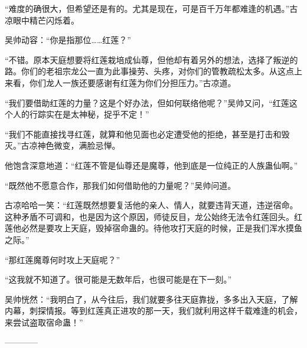 \begin{this_body}
“难度的确很大，但希望还是有的。尤其是现在，可是百千万年都难逢的机遇。”古凉眼中精芒闪烁着。

吴帅动容：“你是指那位……红莲？”

“不错。原本天庭想要将红莲栽培成仙尊，但他却有着另外的想法，选择了叛逆的路。你们的老祖宗龙公一直为此事操劳、头疼，对你们的管教疏松太多。从这点上来看，你们龙人一族还要感谢有红莲为你们分担压力。”古凉道。

“我们要借助红莲的力量？这是个好办法，但如何联络他呢？”吴帅又问，“红莲这个人的行踪实在是太神秘，捉乎不定！”

“我们不能直接找寻红莲，就算和他见面也必定遭受他的拒绝，甚至是打击和毁灭。”古凉神色微变，满脸忌惮。

他饱含深意地道：“红莲不管是仙尊还是魔尊，他到底是一位纯正的人族蛊仙啊。”

“既然他不愿意合作，那我们如何借助他的力量呢？”吴帅问道。

古凉哈哈一笑：“红莲既然想要复活他的亲人、情人，就要违背天道，违逆宿命。这种矛盾不可调和，也是因为这个原因，师徒反目，龙公始终无法令红莲回头。红莲他必然是要攻上天庭，毁掉宿命蛊的。待他攻打天庭的时候，正是我们浑水摸鱼之际。”

“那红莲魔尊何时攻上天庭呢？”

“这我就不知道了。很可能是无数年后，也很可能是在下一刻。”

吴帅恍然：“我明白了，从今往后，我们就要多往天庭靠拢，多多出入天庭，了解内幕，刺探情报。等到红莲真正进攻的那一天，我们就利用这样千载难逢的机会，来尝试盗取宿命蛊！”

------------

\end{this_body}

